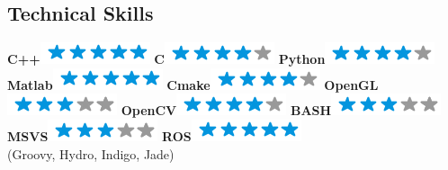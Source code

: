 \documentclass[]{friggeri-cv}
\begin{document}
\begin{aside}
  \section{Technical Skills}
    \textbf{C++}\includegraphics[scale=0.40]{img/5stars.png}
    \textbf{C}\includegraphics[scale=0.40]{img/4stars.png}
    \textbf{Python}\includegraphics[scale=0.40]{img/4stars.png}
    \textbf{Matlab}\includegraphics[scale=0.40]{img/5stars.png}
    \textbf{Cmake}\includegraphics[scale=0.40]{img/4stars.png}
    \textbf{OpenGL}\includegraphics[scale=0.40]{img/3stars.png}
    \textbf{OpenCV}\includegraphics[scale=0.40]{img/4stars.png}
    \textbf{BASH}\includegraphics[scale=0.40]{img/3stars.png}
    \textbf{MSVS}\includegraphics[scale=0.40]{img/3stars.png}
    \textbf{ROS}\includegraphics[scale=0.40]{img/5stars.png}\\ \scriptsize{(Groovy, Hydro, Indigo, Jade)}
    ~
\end{aside}
\end{document}
